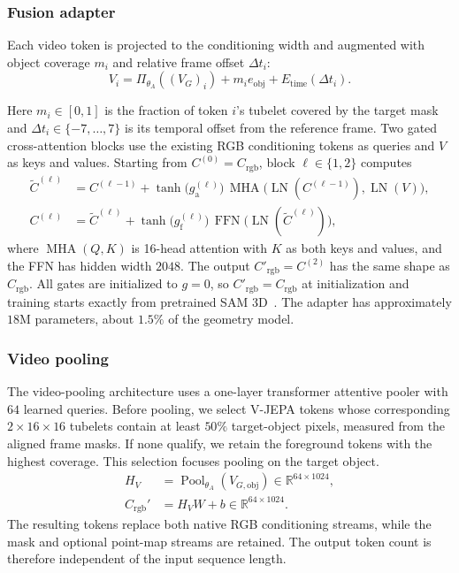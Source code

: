 \documentclass{article}
\begin{document}
\subsubsection{Fusion adapter}
Each video token is projected to the conditioning width and augmented with object coverage $m_i$ and relative frame offset $\Delta t_i$:
\begin{equation}
    V_i=\Pi_{\theta_A}((V_G)_i)+m_i e_{\mathrm{obj}}+E_{\mathrm{time}}(\Delta t_i).
\end{equation}

Here $m_i\in[0,1]$ is the fraction of token $i$'s tubelet covered by the target mask and $\Delta t_i\in\{-7,\dots,7\}$ is its temporal offset from the reference frame. Two gated cross-attention blocks use the existing RGB conditioning tokens as queries and $V$ as keys and values. Starting from $C^{(0)}=C_{\mathrm{rgb}}$, block $\ell\in\{1,2\}$ computes
\begin{equation}
\begin{aligned}
\widetilde C^{(\ell)} &= C^{(\ell-1)} + \tanh\!\big(g^{(\ell)}_{\mathrm{a}}\big)\,
  \operatorname{MHA}\!\big(\operatorname{LN}(C^{(\ell-1)}),\operatorname{LN}(V)\big),\\
C^{(\ell)} &= \widetilde C^{(\ell)} + \tanh\!\big(g^{(\ell)}_{\mathrm{f}}\big)\,
  \operatorname{FFN}\!\big(\operatorname{LN}(\widetilde C^{(\ell)})\big),
\end{aligned}
\end{equation}
where $\operatorname{MHA}(Q,K)$ is 16-head attention with $K$ as both keys and values, and the FFN has hidden width $2048$. The output $C'_{\mathrm{rgb}}=C^{(2)}$ has the same shape as $C_{\mathrm{rgb}}$. All gates are initialized to $g=0$, so $C'_{\mathrm{rgb}}=C_{\mathrm{rgb}}$ at initialization and training starts exactly from pretrained SAM 3D~\cite{flamingo}. The adapter has approximately $18$M parameters, about $1.5\%$ of the geometry model.

\subsubsection{Video pooling}
The video-pooling architecture uses a one-layer transformer attentive pooler with $64$ learned queries. Before pooling, we select V-JEPA tokens whose corresponding $2\times16\times16$ tubelets contain at least $50\%$ target-object pixels, measured from the aligned frame masks. If none qualify, we retain the foreground tokens with the highest coverage. This selection focuses pooling on the target object.
\begin{equation}
\begin{aligned}
    H_V &= \operatorname{Pool}_{\theta_A}(V_{G,\mathrm{obj}})
        \in\mathbb{R}^{64\times1024},\\
    C_{\mathrm{rgb}}' &= H_VW+b\in\mathbb{R}^{64\times1024}.
\end{aligned}
\end{equation}
The resulting tokens replace both native RGB conditioning streams, while the mask and optional point-map streams are retained. The output token count is therefore independent of the input sequence length.
\end{document}
